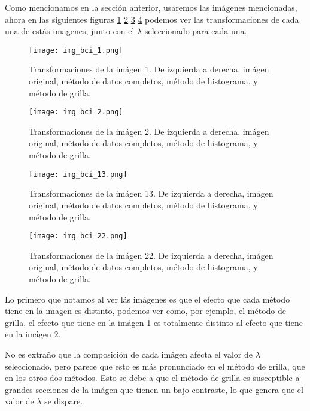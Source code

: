    Como mencionamos en la secci\'on anterior, usaremos las im\'agenes mencionadas, ahora en las siguientes figuras \ref{fig:img_bci_1} \ref{fig:img_bci_2} \ref{fig:img_bci_13} \ref{fig:img_bci_22} podemos ver las transformaciones de cada una de est\'as imagenes, junto con el $\lambda$ seleccionado para cada una.

    \begin{figure}[H]
        \centering
        \texttt{[image: img\_bci\_1.png]}
        \caption{Transformaciones de la im\'agen 1. De izquierda a derecha, im\'agen original, m\'etodo de datos completos, m\'etodo de histograma, y m\'etodo de grilla.}
        \label{fig:img_bci_1}
    \end{figure}

    \begin{figure}[H]
        \centering
        \texttt{[image: img\_bci\_2.png]}
        \caption{Transformaciones de la im\'agen 2. De izquierda a derecha, im\'agen original, m\'etodo de datos completos, m\'etodo de histograma, y m\'etodo de grilla.}
        \label{fig:img_bci_2}
    \end{figure}

    \begin{figure}[H]
        \centering
        \texttt{[image: img\_bci\_13.png]}
        \caption{Transformaciones de la im\'agen 13. De izquierda a derecha, im\'agen original, m\'etodo de datos completos, m\'etodo de histograma, y m\'etodo de grilla.}
        \label{fig:img_bci_13}
    \end{figure}

    \begin{figure}[H]
        \centering
        \texttt{[image: img\_bci\_22.png]}
        \caption{Transformaciones de la im\'agen 22. De izquierda a derecha, im\'agen original, m\'etodo de datos completos, m\'etodo de histograma, y m\'etodo de grilla.}
        \label{fig:img_bci_22}
    \end{figure}


    Lo primero que notamos al ver l\'as im\'agenes es que el efecto que cada m\'etodo tiene en la imagen es distinto, podemos ver como, por ejemplo, el m\'etodo de grilla, el efecto que tiene en la im\'agen 1 es totalmente distinto al efecto que tiene en la im\'agen 2. 

    No es extra\~no que la composici\'on de cada im\'agen afecta el valor de $\lambda$ seleccionado, pero parece que esto es m\'as pronunciado en el m\'etodo de grilla, que en los otros dos m\'etodos. Esto se debe a que el m\'etodo de grilla es susceptible a grandes secciones de la im\'agen que tienen un bajo contraste, lo que genera que el valor de $\lambda$ se dispare. 

